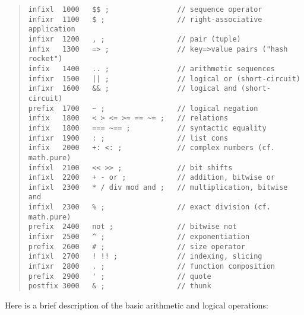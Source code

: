 \documentclass[a4paper,12pt]{article}
\begin{document}
\begin{quote}\small
\begin{lstlisting}
infixl  1000   $$ ;                // sequence operator
infixr  1100   $ ;                 // right-associative application
infixr  1200   , ;                 // pair (tuple)
infix   1300   => ;                // key=>value pairs ("hash rocket")
infix   1400   .. ;                // arithmetic sequences
infixr  1500   || ;                // logical or (short-circuit)
infixr  1600   && ;                // logical and (short-circuit)
prefix  1700   ~ ;                 // logical negation
infix   1800   < > <= >= == ~= ;   // relations
infix   1800   === ~== ;           // syntactic equality
infixr  1900   : ;                 // list cons
infix   2000   +: <: ;             // complex numbers (cf. math.pure)
infixl  2100   << >> ;             // bit shifts
infixl  2200   + - or ;            // addition, bitwise or
infixl  2300   * / div mod and ;   // multiplication, bitwise and
infixl  2300   % ;                 // exact division (cf. math.pure)
prefix  2400   not ;               // bitwise not
infixr  2500   ^ ;                 // exponentiation
prefix  2600   # ;                 // size operator
infixl  2700   ! !! ;              // indexing, slicing
infixr  2800   . ;                 // function composition
prefix  2900   ' ;                 // quote
postfix 3000   & ;                 // thunk
\end{lstlisting}
\end{quote}

Here is a brief description of the basic arithmetic and logical operations:
\end{document}
